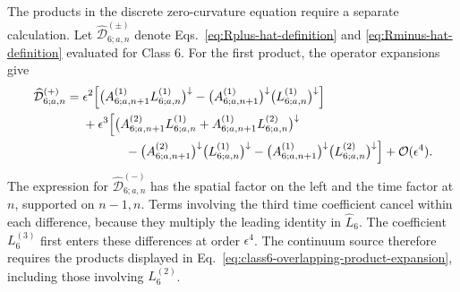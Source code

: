 The products in the discrete zero-curvature equation require a separate
calculation.  Let $\widehat{\mathcal D}^{(\pm)}_{6;a,n}$ denote
Eqs.~\eqref{eq:Rplus-hat-definition} and
\eqref{eq:Rminus-hat-definition} evaluated for Class 6.  For the first
product, the operator expansions give
\begin{align}
\widehat{\mathcal D}^{(+)}_{6;a,n}
={}&\epsilon^2\Bigl[
\bigl(A^{(1)}_{6;a,n+1}L^{(1)}_{6;a,n}\bigr)^\downarrow
-\bigl(A^{(1)}_{6;a,n+1}\bigr)^\downarrow
 \bigl(L^{(1)}_{6;a,n}\bigr)^\downarrow
\Bigr]
\nonumber\\
&+\epsilon^3\Bigl[
\bigl(A^{(2)}_{6;a,n+1}L^{(1)}_{6;a,n}
+A^{(1)}_{6;a,n+1}L^{(2)}_{6;a,n}\bigr)^\downarrow
\nonumber\\
&\hspace{3.4em}
-\bigl(A^{(2)}_{6;a,n+1}\bigr)^\downarrow
 \bigl(L^{(1)}_{6;a,n}\bigr)^\downarrow
-\bigl(A^{(1)}_{6;a,n+1}\bigr)^\downarrow
 \bigl(L^{(2)}_{6;a,n}\bigr)^\downarrow
\Bigr]
+\mathcal O(\epsilon^4).
\label{eq:class6-overlapping-product-expansion}
\end{align}
The expression for $\widehat{\mathcal D}^{(-)}_{6;a,n}$ has the spatial
factor on the left and the time factor at $n$, supported on $n-1,n$.
Terms involving the third time coefficient cancel within each difference,
because they multiply the leading identity in $\widehat L_6$.
The coefficient $L_6^{(3)}$ first enters these differences at order
$\epsilon^4$.  The continuum source therefore requires the products
displayed in Eq.~\eqref{eq:class6-overlapping-product-expansion}, including
those involving $L_6^{(2)}$.

